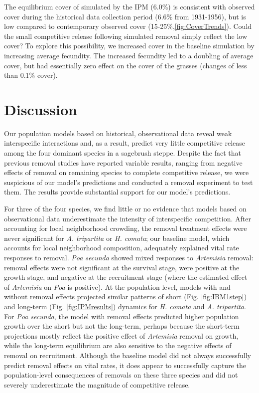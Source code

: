 \documentclass[11pt]{article}
\begin{document}
\begin{doublespacing}
 The equilibrium cover of  simulated by the IPM (6.0\%) is consistent with observed cover during the historical data collection period (6.6\% from 1931-1956), but is low compared to contemporary observed cover (15-25\%,\ref{fig:CoverTrends}). Could the small competitive release following simulated  removal simply reflect the low  cover? To explore this possibility, we increased  cover in the baseline simulation by increasing average  fecundity. The increased fecundity led to a doubling of  average cover, but had essentially zero effect on the cover of the grasses (changes of less than 0.1\% cover). 

\section*{Discussion}

Our population models based on historical, observational data reveal weak interspecific interactions \citep{adler_coexistence_2010,chu_large_2015} and, as a result, predict very little competitive release among the four dominant species in a sagebrush steppe. Despite the fact that previous removal studies have reported variable results, ranging from negative effects of removal on remaining species to complete competitive release, we were suspicious of our model's predictions and conducted a removal experiment to test them. The results provide substantial support for our model's predictions.

For three of the four species, we find little or no evidence that models based on observational data underestimate the intensity of interspecific competition. After accounting for local neighborhood crowding, the removal treatment effects were never significant for \textit{A. tripartita} or \textit{H. comata}; our baseline model, which accounts for local neighborhood composition, adequately explained vital rate responses to  removal.  \textit{Poa secunda} showed mixed responses to \textit{Artemisia} removal: removal effects were not significant at the survival stage, were positive at the growth stage, and negative at the recruitment stage (where the estimated effect of \textit{Artemisia} on \textit{Poa} is positive). At the population level, models with and without removal effects projected similar patterns of short (Fig. \ref{fig:IBM1step}) and long-term (Fig. \ref{fig:IPMresults}) dynamics for \textit{H. comata} and \textit{A. tripartita}. For \textit{Poa secunda}, the model with removal effects predicted higher population growth over the short but not the long-term, perhaps because the short-term projections mostly reflect the positive effect of \textit{Artemisia} removal on growth, while the long-term equilibrium are also sensitive to the negative effects of removal on recruitment. Although the baseline model did not always successfully predict removal effects on vital rates, it does appear to successfully capture the population-level consequences of removals on these three species and did not severely underestimate the magnitude of competitive release.


\end{doublespacing}
\end{document}
